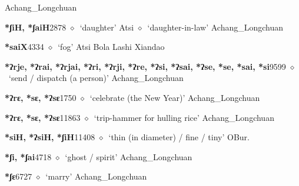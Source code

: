 \begin{list}{}{\leftmargin=1.5em \itemindent=-1.5em}
         Achang\_Longchuan 
  \item {\footnotesize \textbf{*ʃiH, *ʃaiH}}{\tiny 2878}
\hspace{1ex}
         $\diamond$~`daughter'
         Atsi 
\hspace{1ex}
         $\diamond$~`daughter-in-law'
         Achang\_Longchuan 
  \item {\footnotesize \textbf{*saiX}}{\tiny 4334}
\hspace{1ex}
         $\diamond$~`fog'
         Atsi 
\hspace{1ex}
         Bola 
\hspace{1ex}
         Lashi 
\hspace{1ex}
         Xiandao 
  \item {\footnotesize \textbf{*ʔrje, *ʔrai, *ʔrjai, *ʔri, *ʔrji, *ʔre, *ʔsi, *ʔsai, *ʔse, *se, *sai, *si}}{\tiny 9599}
\hspace{1ex}
         $\diamond$~`send / dispatch (a person)'
         Achang\_Longchuan 
  \item {\footnotesize \textbf{*ʔrɛ, *sɛ, *ʔsɛ}}{\tiny 1750}
\hspace{1ex}
         $\diamond$~`celebrate (the New Year)'
         Achang\_Longchuan 
  \item {\footnotesize \textbf{*ʔrɛ, *sɛ, *ʔsɛ}}{\tiny 11863}
\hspace{1ex}
         $\diamond$~`trip-hammer for hulling rice'
         Achang\_Longchuan 
  \item {\footnotesize \textbf{*siH, *ʔsiH, *ʃiH}}{\tiny 11408}
\hspace{1ex}
         $\diamond$~`thin (in diameter) / fine / tiny'
         OBur. 
  \item {\footnotesize \textbf{*ʃi, *ʃai}}{\tiny 4718}
\hspace{1ex}
         $\diamond$~`ghost / spirit'
         Achang\_Longchuan 
  \item {\footnotesize \textbf{*ʃɛ}}{\tiny 6727}
\hspace{1ex}
         $\diamond$~`marry'
         Achang\_Longchuan 

\end{list}
